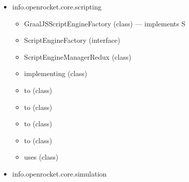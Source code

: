 \documentclass{amsdtx}
\begin{document}
\begin{itemize}
\begin{itemize}
\begin{itemize}
    \item
      BredthFirstRecusiveVisitor (class)
    \item
      DepthFirstRecursiveVisitor (class)
    \item
      ListComponents (class)
    \item
      ListMotorMounts (class) --- extends L
    \end{itemize}
  \item
    info.openrocket.core.scripting

    \begin{itemize}
    
    \item
      GraalJSScriptEngineFactory (class) --- implements S
    \item
      ScriptEngineFactory (interface)
    \item
      ScriptEngineManagerRedux (class)
    \item
      implementing (class)
    \item
      to (class)
    \item
      to (class)
    \item
      to (class)
    \item
      to (class)
    \item
      uses (class)
    \end{itemize}
  \item
    info.openrocket.core.simulation

    \begin{itemize}
    

\end{itemize}
\end{itemize}
\end{itemize}
\end{document}
